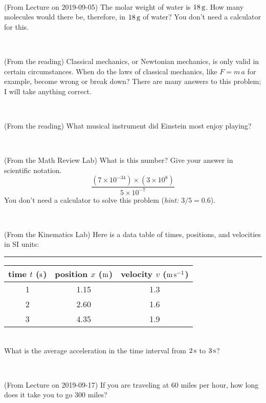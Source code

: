 \documentclass[12pt, letterpaper]{article}
\begin{document}
\vfill ~

\begin{problem} (From Lecture on 2019-09-05)
The molar weight of water is $18\,\mathrm{g}$. How many molecules would there
be, therefore, in $18\,\mathrm{g}$ of water? You don't need a calculator for
this.
\end{problem}


\vfill ~

\begin{problem} (From the reading)
Classical mechanics, or Newtonian mechanics, is only valid in certain
circumstances. When do the laws of classical mechanics, like $F =
m\,a$ for example, become wrong or break down? There are many answers
to this problem; I will take anything correct.
\end{problem}


\vfill ~

\begin{problem} (From the reading)
What musical instrument did Einstein most enjoy playing?
\end{problem}


\vfill ~


\clearpage


\begin{problem} (From the Math Review Lab)
What is this number? Give your answer in scientific notation.
$$
\frac{(7\times10^{-34})\times(3\times10^8)}{5\times10^{-7}}
$$
You don't need a calculator to solve this problem (\textit{hint: $3/5=0.6$}).
\end{problem}


\vfill ~

\begin{problem} (From the Kinematics Lab)
Here is a data table of times, positions, and velocities in SI units:\\
\rule{1.0in}{0pt}\begin{tabular}{c|c|c}
time $t$ ($\mathrm{s}$) & position $x$ ($\mathrm{m}$) & velocity $v$ ($\mathrm{m}\,\mathrm{s}^{-1}$) \\
\hline
1 & 1.15 & 1.3 \\
2 & 2.60 & 1.6 \\
3 & 4.35 & 1.9 \\
\hline
\end{tabular}\\
What is the average acceleration in the time interval from $2\,\mathrm{s}$ to $3\,\mathrm{s}$?
\end{problem}


\vfill ~

\begin{problem} (From Lecture on 2019-09-17)
If you are traveling at 60 miles per hour, how long does
it take you to go 300 miles?
\end{problem}
\end{document}
